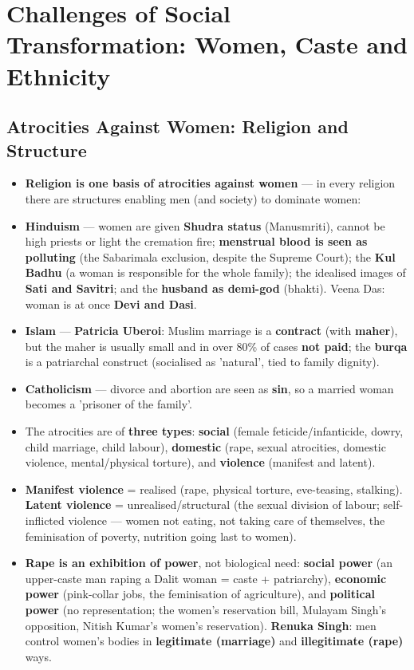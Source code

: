 \chapter{Challenges of Social Transformation: Women, Caste and Ethnicity}

\section{Atrocities Against Women: Religion and Structure}

\begin{KeyConcept}
\begin{itemize}
\item \textbf{Religion is one basis of atrocities against women} --- in every religion there are structures enabling men (and society) to dominate women:
\item \textbf{Hinduism} --- women are given \textbf{Shudra status} (Manusmriti), cannot be high priests or light the cremation fire; \textbf{menstrual blood is seen as polluting} (the Sabarimala exclusion, despite the Supreme Court); the \textbf{Kul Badhu} (a woman is responsible for the whole family); the idealised images of \textbf{Sati and Savitri}; and the \textbf{husband as demi-god} (bhakti). Veena Das: woman is at once \textbf{Devi and Dasi}.
\item \textbf{Islam} --- \textbf{Patricia Uberoi}: Muslim marriage is a \textbf{contract} (with \textbf{maher}), but the maher is usually small and in over 80\% of cases \textbf{not paid}; the \textbf{burqa} is a patriarchal construct (socialised as 'natural', tied to family dignity).
\item \textbf{Catholicism} --- divorce and abortion are seen as \textbf{sin}, so a married woman becomes a 'prisoner of the family'.
\item The atrocities are of \textbf{three types}: \textbf{social} (female feticide/infanticide, dowry, child marriage, child labour), \textbf{domestic} (rape, sexual atrocities, domestic violence, mental/physical torture), and \textbf{violence} (manifest and latent).
\item \textbf{Manifest violence} = realised (rape, physical torture, eve-teasing, stalking). \textbf{Latent violence} = unrealised/structural (the sexual division of labour; self-inflicted violence --- women not eating, not taking care of themselves, the feminisation of poverty, nutrition going last to women).
\item \textbf{Rape is an exhibition of power}, not biological need: \textbf{social power} (an upper-caste man raping a Dalit woman = caste + patriarchy), \textbf{economic power} (pink-collar jobs, the feminisation of agriculture), and \textbf{political power} (no representation; the women's reservation bill, Mulayam Singh's opposition, Nitish Kumar's women's reservation). \textbf{Renuka Singh}: men control women's bodies in \textbf{legitimate (marriage)} and \textbf{illegitimate (rape)} ways.

\end{itemize}
\end{KeyConcept}
